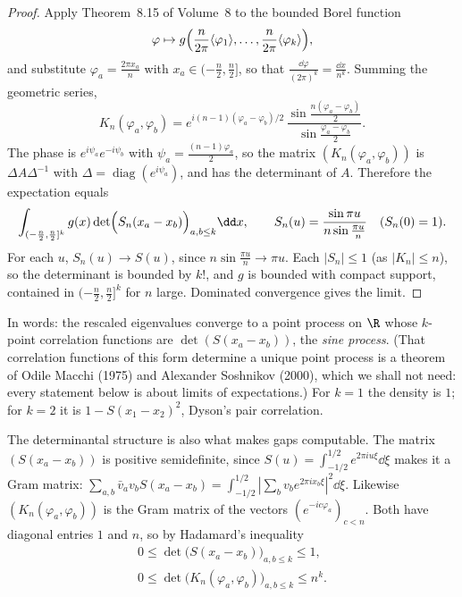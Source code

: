 \begin{proof}
Apply Theorem~8.15 of Volume~8 to the bounded Borel function
\[
\varphi\mapsto g\Bigl(\frac n{2\pi}\langle\varphi_1\rangle,\dots,\frac n{2\pi}\langle\varphi_k\rangle\Bigr),
\]
and substitute $\varphi_a=\frac{2\pi x_a}n$ with $x_a\in(-\frac n2,\frac n2]$, so that
$\frac{\dd\varphi}{(2\pi)^k}=\frac{\dd x}{n^k}$. Summing the geometric series,
\[
K_n(\varphi_a,\varphi_b)=e^{i(n-1)(\varphi_a-\varphi_b)/2}\,\frac{\sin\frac{n(\varphi_a-\varphi_b)}2}{\sin\frac{\varphi_a-\varphi_b}2}.
\]
The phase is $e^{i\psi_a}e^{-i\psi_b}$ with $\psi_a=\frac{(n-1)\varphi_a}2$, so the matrix $(K_n(\varphi_a,\varphi_b))$ is $\Delta A\Delta^{-1}$ with $\Delta=\operatorname{diag}(e^{i\psi_a})$, and has the determinant of $A$. Therefore the expectation equals
\[
\int_{(-\frac n2,\frac n2]^k}g(x)\det\Bigl(S_n(x_a-x_b)\Bigr)_{a,b\le k}\dd x,\qquad S_n(u)=\frac{\sin\pi u}{n\sin\frac{\pi u}n}\quad(S_n(0)=1).
\]
For each $u$, $S_n(u)\to S(u)$, since $n\sin\frac{\pi u}n\to\pi u$. Each $|S_n|\le1$ (as $|K_n|\le n$), so the determinant is bounded by $k!$, and $g$ is bounded with compact support, contained in $(-\frac n2,\frac n2]^k$ for $n$ large.
Dominated convergence gives the limit.
\end{proof}

In words: the rescaled eigenvalues converge to a point process on $\R$ whose $k$-point correlation functions are $\det(S(x_a-x_b))$, the \emph{sine process}. (That correlation functions of this form determine a unique point
process is a theorem of Odile Macchi (1975) and Alexander Soshnikov (2000), which we shall not need: every statement below is about limits of expectations.) For $k=1$ the density is $1$; for $k=2$ it is $1-S(x_1-x_2)^2$,
Dyson's pair correlation.

The determinantal structure is also what makes gaps computable. The matrix $(S(x_a-x_b))$ is positive semidefinite, since $S(u)=\int_{-1/2}^{1/2}e^{2\pi iu\xi}\dd\xi$ makes it a Gram matrix: $\sum_{a,b}\bar v_av_bS(x_a-x_b)=\int_{-1/2}^{1/2}|\sum_bv_be^{2\pi ix_b\xi}|^2\dd\xi$. Likewise
$(K_n(\varphi_a,\varphi_b))$ is the Gram matrix of the vectors $(e^{-ic\varphi_a})_{c<n}$. Both have diagonal entries $1$ and $n$, so by Hadamard's inequality
\begin{equation}\label{eq:detbound}
\begin{gathered}
0\le\det\bigl(S(x_a-x_b)\bigr)_{a,b\le k}\le1,\\
0\le\det\bigl(K_n(\varphi_a,\varphi_b)\bigr)_{a,b\le k}\le n^k.
\end{gathered}
\end{equation}

